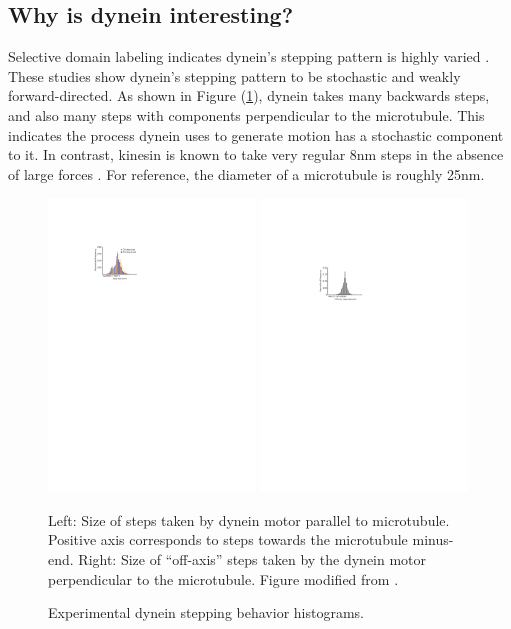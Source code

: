 \documentclass[
11pt, %
english, %
singlespacing, %
headsepline, %
chapterinoneline, %
]{MastersDoctoralThesis} %
\begin{document}
\subsection{Why is dynein interesting?}
Selective domain labeling indicates dynein's stepping pattern is highly varied \cite{reck2006single, weihongpaper}. These studies show dynein's stepping pattern to be stochastic and weakly forward-directed. As shown in Figure (\ref{fig:weihong-steps}), dynein takes many backwards steps, and also many steps with components perpendicular to the microtubule. This indicates the process dynein uses to generate motion has a stochastic component to it. In contrast, kinesin is known to take very regular 8nm steps in the absence of large forces \cite{kinesin-step-size}. For reference, the diameter of a microtubule is roughly 25nm.\\

\begin{figure}[h!]
  \centering
  \includegraphics[width=0.49\textwidth]{../../figures/weihong-step-size}
  \includegraphics[width=0.49\textwidth]{../../figures/weihong-off-axis-steps}
    \caption{Experimental dynein stepping behavior histograms.}{Left: Size of steps taken by dynein motor parallel to microtubule. Positive axis corresponds to steps towards the microtubule minus-end. Right: Size of ``off-axis'' steps taken by the dynein motor perpendicular to the microtubule. Figure modified from \cite{weihongpaper}.}
  \label{fig:weihong-steps}
\end{figure}
\end{document}
